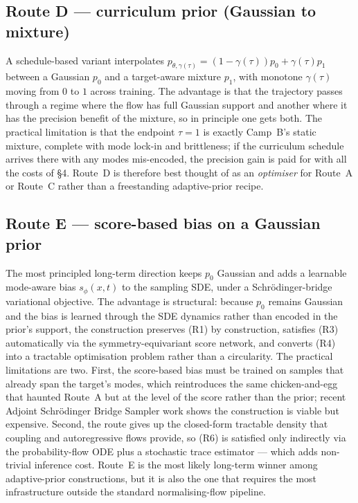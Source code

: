 \documentclass[11pt,letterpaper]{article}
\theoremstyle{plain}
\begin{document}
\subsection{Route D --- curriculum prior (Gaussian to mixture)}

A schedule-based variant interpolates
$p_{\theta,\gamma(\tau)}=(1-\gamma(\tau))p_0+\gamma(\tau)p_1$ between a
Gaussian $p_0$ and a target-aware mixture $p_1$, with monotone $\gamma(\tau)$
moving from $0$ to $1$ across training. The advantage is that the
trajectory passes through a regime where the flow has full Gaussian support
and another where it has the precision benefit of the mixture, so in
principle one gets both. The practical limitation is that the endpoint
$\tau=1$ is exactly Camp~B's static mixture, complete with mode lock-in
and brittleness; if the curriculum schedule arrives there with any modes
mis-encoded, the precision gain is paid for with all the costs of \S4.
Route~D is therefore best thought of as an \emph{optimiser} for Route~A or
Route~C rather than a freestanding adaptive-prior recipe.

\subsection{Route E --- score-based bias on a Gaussian prior}

The most principled long-term direction keeps $p_0$ Gaussian and adds a
learnable mode-aware bias $s_\phi(x,t)$ to the sampling SDE, under a
Schrödinger-bridge variational objective. The advantage is structural:
because $p_0$ remains Gaussian and the bias is learned through the SDE
dynamics rather than encoded in the prior's support, the construction
preserves (R1) by construction, satisfies (R3) automatically via the
symmetry-equivariant score network, and converts (R4) into a tractable
optimisation problem rather than a circularity. The practical limitations
are two. First, the score-based bias must be trained on samples that
already span the target's modes, which reintroduces the same chicken-and-egg
that haunted Route~A but at the level of the score rather than the prior;
recent Adjoint Schrödinger Bridge Sampler work shows the construction is
viable but expensive. Second, the route gives up the
closed-form tractable density that coupling and autoregressive flows
provide, so (R6) is satisfied only indirectly via the probability-flow
ODE plus a stochastic trace estimator --- which adds non-trivial inference
cost. Route~E is the most likely long-term winner among adaptive-prior
constructions, but it is also the one that requires the most
infrastructure outside the standard normalising-flow pipeline.
\end{document}
